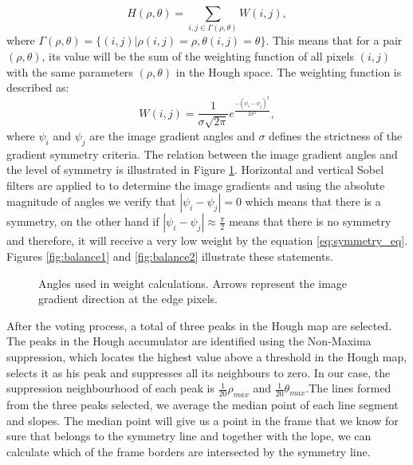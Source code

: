 \begin{description}
\begin{equation}
	H(\rho,\theta) = \sum_{i,j \in \Gamma(\rho,\theta)}W(i,j),
\end{equation}		
where $\Gamma(\rho,\theta) = \{(i,j) | \rho(i,j) = \rho, \theta(i,j) = \theta\}$.
This means that for a pair $(\rho,\theta)$, its value will be the sum of the weighting function of all pixels $(i,j)$ with the same parameters $(\rho,\theta)$ in the Hough space. The weighting function is described as:
\begin{equation}
	W(i,j) = \frac{1}{\sigma\sqrt{2\pi}}e^{\frac{-(\psi_{i}-\psi_{j})^{2}}{2\sigma^{2}}},
	\label{eq:symmetry_eq}
\end{equation}
where $\psi_{i}$ and $\psi_{j}$ are the image gradient angles and $\sigma$ defines the strictness of the gradient symmetry criteria. The relation between the image gradient angles and the level of symmetry is illustrated in Figure \ref{fig:image_balance_fig}. Horizontal and vertical Sobel filters are applied to to determine the image gradients and using the absolute magnitude of angles we verify that $|\psi_{i} - \psi_{j}| = 0$ which means that there is a symmetry, on the other hand if $|\psi_{i} - \psi_{j}| \approx \frac{\pi}{2}$ means that there is no symmetry and therefore, it will receive a very low weight by the equation \ref{eq:symmetry_eq}. Figures \ref{fig:balance1} and \ref{fig:balance2} illustrate these statements.
\begin{figure}[htbp]
	\centering
    \caption{Angles used in weight calculations. Arrows represent the image gradient direction at the edge pixels. \cite{li2006real}}
    \label{fig:image_balance_fig}
\end{figure}
	After the voting process, a total of three peaks in the Hough map are selected. The peaks in the Hough accumulator are identified using the Non-Maxima suppression, which locates the highest value above a threshold in the Hough map, selects it as his peak and suppresses all its neighbours to zero. In our case, the suppression neighbourhood of each peak is $\frac{1}{20}\rho_{max}$ and $\frac{1}{20}\theta_{max}$.The lines formed from the three peaks selected, we average the median point of each line segment and slopes. The median point will give us a point in the frame that we know for sure that belongs to the symmetry line and together with the lope, we can calculate which of the frame borders are intersected by the symmetry line.
	

\end{description}
